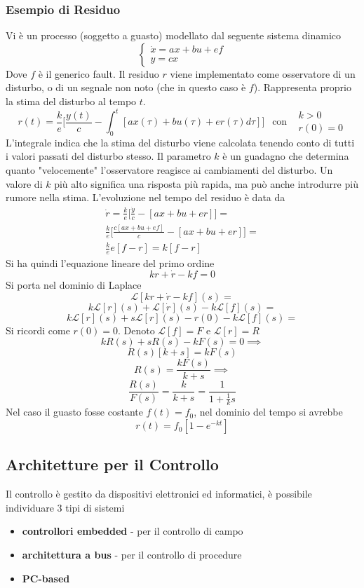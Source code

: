\documentclass[10pt, letterpaper]{report}
\begin{document}
\subsubsection{Esempio di Residuo}
Vi è un processo (soggetto a guasto) modellato dal seguente sistema dinamico$$\begin{cases}
    \dot{x}=ax+bu+ef\\y=cx
\end{cases} $$
Dove $f$ è il generico fault. Il residuo $r$ viene implementato come osservatore di un disturbo, o di un 
segnale non noto (che in questo caso è $f$).  Rappresenta proprio la stima del disturbo al tempo $t$.
$$ r(t)=\frac{k}{e}\Big[
\frac{y(t)}{c}-\int_0^t[ax(\tau)+bu(\tau)+er(\tau)d\tau]\Big] \ \  \text{ con }\ \ \begin{matrix}
    k>0\\ r(0)=0
\end{matrix}    
$$
L'integrale indica che la stima del disturbo viene calcolata tenendo conto di tutti i valori passati del disturbo stesso.\acc 
Il parametro $k$ è un guadagno che determina quanto "velocemente" l'osservatore reagisce ai cambiamenti del disturbo. Un valore di $k$ più alto significa una risposta più rapida, ma può anche introdurre più rumore nella stima.
L'evoluzione nel tempo del residuo è data da 
\begin{eqnarray}
    \dot{r}=\frac{k}{e}\Big[ \frac{\dot{y}}{c}-[ax+bu+er] \Big] = \\
    \frac{k}{e}\Big[ \frac{c[ax+bu+ef]}{c}-[ax+bu+er] \Big] = \\
    \frac{k}{e}e[f-r] = k[f-r]
\end{eqnarray}
Si ha quindi l'equazione lineare del primo ordine 
$$ kr+\dot{r}-kf=0$$
Si porta nel dominio di Laplace 
$$\mathcal{L}[kr+\dot{r}-kf](s)= $$ $$ 
k\mathcal{L}[r](s)+
\mathcal{L}[\dot{r}](s)-
k\mathcal{L}[f](s) = 
$$$$ 
k\mathcal{L}[r](s)+
s\mathcal{L}[r](s)-r(0)-
k\mathcal{L}[f](s) = 
$$
Si ricordi come $r(0)=0$. Denoto $\mathcal{L}[f]=F$ e $\mathcal{L}[r]=R$
$$ 
kR(s)+sR(s)-kF(s)=0\implies 
$$ $$ 
R(s)[k+s]=kF(s)
$$ 
$$
R(s)=\frac{kF(s)}{k+s} \implies 
$$ 
$$ \frac{R(s)}{F(s)}=\frac{k}{k+s}=\frac{1}{1+\frac{1}{k}s} $$
Nel caso il guasto fosse costante $f(t)=f_0$, nel dominio del tempo si avrebbe 
$$ r(t)=f_0[1-e^{-kt}]$$
\subsection{Architetture per il Controllo}
Il controllo è gestito da dispositivi elettronici ed informatici, è possibile individuare 3 tipi di 
sistemi\begin{itemize}
    \item \textbf{controllori embedded} - per il controllo di campo 
    \item \textbf{architettura a bus} - per il controllo di procedure 
    \item \textbf{PC-based}
\end{itemize}
\end{document}
